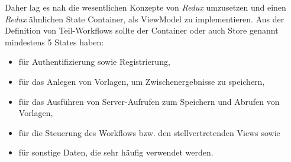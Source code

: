 \documentclass[nomenclature, oneside, 150]{HSMW-Thesis}
\begin{document}
		Daher lag es nah die wesentlichen Konzepte von \textit{Redux} umzusetzen und einen \textit{Redux} ähnlichen State Container, als ViewModel zu implementieren. Aus der Definition von Teil-Workflows sollte der Container oder auch Store genannt mindestens 5 States haben: 
		\begin{itemize}
			\item für Authentifizierung sowie Registrierung,
			\item für das Anlegen von Vorlagen, um Zwischenergebnisse zu speichern,
			\item für das Ausführen von Server-Aufrufen zum Speichern und Abrufen von Vorlagen, 
			\item für die Steuerung des Workflows bzw. den stellvertretenden Views sowie
			\item für sonstige Daten, die sehr häufig verwendet werden.
		\end{itemize}
		
\end{document}
